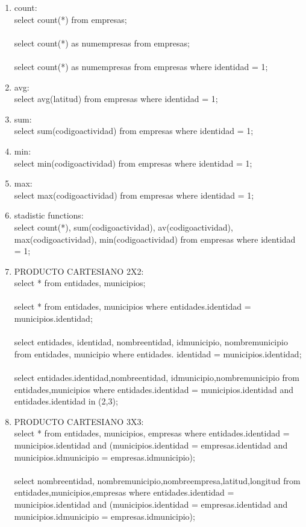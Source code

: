 \documentclass[10pt]{article}         %
\begin{document}
\begin{enumerate}
	\item count:\\
		select count(*) from empresas;\\
		\\
		select count(*) as numempresas from empresas;\\
		\\
		select count(*) as numempresas from empresas where identidad = 1;

	\item avg:\\
		select avg(latitud) from empresas where identidad = 1;

	\item sum:\\
		select sum(codigoactividad) from empresas where identidad = 1;

	\item min:\\
		select min(codigoactividad) from empresas where identidad = 1;

	\item max:\\
		select max(codigoactividad) from empresas where identidad = 1;

	\item stadistic functions:\\
		select count(*), sum(codigoactividad), av(codigoactividad), max(codigoactividad),
min(codigoactividad) from empresas where identidad = 1;

	\item PRODUCTO CARTESIANO 2X2:\\
		select * from entidades, municipios;\\
		\\
		select * from entidades, municipios where entidades.identidad = municipios.identidad;\\
		\\
		select entidades, identidad, nombreentidad, idmunicipio, nombremunicipio from entidades, municipio where entidades. identidad = municipios.identidad;\\
		\\
		select entidades.identidad,nombreentidad, idmunicipio,nombremunicipio from entidades,municipios where entidades.identidad = municipios.identidad and entidades.identidad in (2,3);
	
	\item PRODUCTO CARTESIANO 3X3:\\
		select * from entidades, municipios, empresas where entidades.identidad = municipios.identidad and (municipios.identidad = empresas.identidad and municipios.idmunicipio = empresas.idmunicipio);\\
\\
select nombreentidad, nombremunicipio,nombreempresa,latitud,longitud from entidades,municipios,empresas where entidades.identidad = municipios.identidad and (municipios.identidad = empresas.identidad and municipios.idmunicipio = empresas.idmunicipio);

\end{enumerate}
\end{document}
